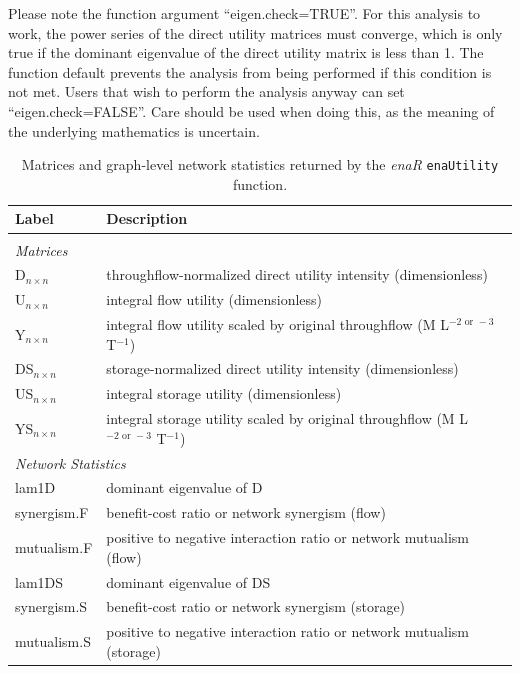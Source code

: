 \documentclass[article]{jss}
\begin{document}
Please note the function argument ``eigen.check=TRUE''.  For this
analysis to work, the power series of the direct utility matrices must
converge, which is only true if the dominant eigenvalue of the direct
utility matrix is less than 1. The function default prevents the
analysis from being performed if this condition is not met. Users that
wish to perform the analysis anyway can set ``eigen.check=FALSE''.  Care
should be used when doing this, as the meaning of the underlying
mathematics is uncertain.

\begin{table}[t]
  \caption{Matrices and graph-level network statistics returned by the \textit{enaR}
    \texttt{enaUtility} function.}\label{tab:utility}                  %
\center
\begin{small}
  \begin{tabular}{l l}
    \textbf{Label} & \textbf{Description} \\ \hline \\[-1.5ex]
    \multicolumn{2}{l}{\textit{Matrices}} \\[1ex]
    D$_{n\times n}$ & throughflow-normalized direct utility intensity (dimensionless)\\
    U$_{n\times n}$ & integral flow utility (dimensionless) \\
    Y$_{n\times n}$ & integral flow utility scaled by original throughflow (M L$^{-2 \textrm{ or } -3}$ T$^{-1}$)\\
    DS$_{n\times n}$ & storage-normalized direct utility intensity (dimensionless)\\
    US$_{n\times n}$ & integral storage utility (dimensionless) \\
    YS$_{n\times n}$ & integral storage utility scaled by original throughflow (M L$^{-2  \textrm{ or }  -3}$ T$^{-1}$)\\ [1ex]
    \multicolumn{2}{l}{\textit{Network Statistics}} \\[1ex]
    lam1D & dominant eigenvalue of D\\
    synergism.F & benefit-cost ratio or network synergism (flow)\\
    mutualism.F & positive to negative interaction ratio or network mutualism (flow)\\
    lam1DS & dominant eigenvalue of DS\\
    synergism.S & benefit-cost ratio or network synergism (storage) \\
    mutualism.S & positive to negative interaction ratio or network mutualism (storage)\\ \hline
\end{tabular}
\end{small}
\end{table}
\end{document}
